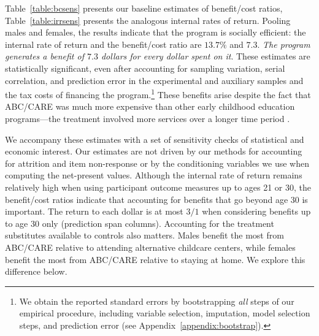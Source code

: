 Table~\ref{table:bcsens} presents our baseline estimates of benefit/cost ratios, Table~\ref{table:irrsens} presents the analogous internal rates of return. Pooling males and females, the results indicate that the program is socially efficient: the internal rate of return and the benefit/cost ratio are $13.7\%$ and $7.3$. \textit{The program generates a benefit of $7.3$ dollars for every dollar spent on it}. These estimates are statistically significant, even after accounting for sampling variation, serial correlation, and prediction error in the experimental and auxiliary samples and the tax costs of financing the program.\footnote{We obtain the reported standard errors by bootstrapping \emph{all} steps of our empirical procedure, including variable selection, imputation, model selection steps, and prediction error (see  Appendix~\ref{appendix:bootstrap}).} These benefits arise despite the fact that ABC/CARE was much more expensive than other early childhood education programs---the treatment involved more services over a longer time period \citep{Elango_Hojman_etal_2016_Early-Edu}.

We accompany these estimates with a set of sensitivity checks of statistical and economic interest. Our estimates are not driven by our methods for accounting for attrition and item non-response or by the conditioning variables we use when computing the net-present values. Although the internal rate of return remains relatively high when using participant outcome measures up to ages 21 or 30, the benefit/cost ratios indicate that accounting for benefits that go beyond age 30 is important. The return to each dollar is at most $3/1$ when considering benefits up to age 30 only (prediction span columns). Accounting for the treatment substitutes available to controls also matters. Males benefit the most from ABC/CARE relative to attending alternative childcare centers, while females benefit the most from ABC/CARE relative to staying at home. We explore this difference below.

